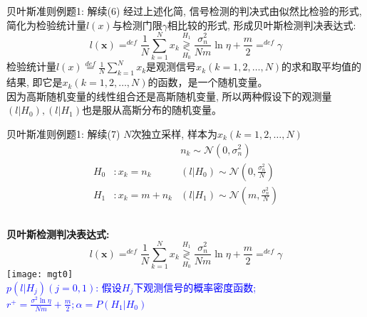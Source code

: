 \begin{frame}[shrink]{贝叶斯准则例题1: 解续(6)}
经过上述化简, 信号检测的判决式由似然比检验的形式, 简化为检验统计量$l(x)$与检测门限$\gamma$相比较的形式, 形成贝叶斯检测判决表达式:
\[
l(\bm{x})\mathop{=}^{def}\frac{1}{N}\sum\limits_{k=1}^{N}x_k\mathop{\gtrless}\limits_{H_0}^{H_1}\frac{\sigma_n^2}{Nm}\ln\eta+\frac{m}{2}\mathop{=}^{def}\gamma
\]
检验统计量$l(x)\mathop{=}\limits^{def}\frac{1}{N}\sum\limits_{k=1}^Nx_k$是观测信号$x_k(k=1,2,\dots,N)$的求和取平均值的结果, 即它是$x_k(k=1,2,\dots,N)$的函数，是一个随机变量。\\
因为高斯随机变量的线性组合还是高斯随机变量,  所以两种假设下的观测量$(l|H_0),(l|H_1)$也是服从高斯分布的随机变量。
\end{frame}

\begin{frame}[shrink]{贝叶斯准则例题1: 解续(7)}
$N$次独立采样, 样本为$x_k(k=1,2,\dots,N)$
\begin{align*}
	&&n_k\sim\mathcal{N}(0,\sigma_n^2)\\ 
	H_0 &:x_k=n_k   &(l|H_0)\sim\mathcal{N}(0,\frac{\sigma_n^2}{N})\\
	H_1 &:x_k=m+n_k &(l|H_1)\sim\mathcal{N}(m,\frac{\sigma_n^2}{N})
\end{align*}
\begin{columns}
\textbf{贝叶斯检测判决表达式:}\\
\[
l(\bm{x})\mathop{=}^{def}\frac{1}{N}\sum\limits_{k=1}^{N}x_k\mathop{\gtrless}\limits_{H_0}^{H_1}\frac{\sigma_n^2}{Nm}\ln\eta+\frac{m}{2}\mathop{=}^{def}\gamma
\]
\texttt{[image: mgt0]}\\
\scriptsize
\textcolor{blue}{$p(l|H_j)(j=0,1)$: 假设$H_j$下观测信号的概率密度函数; $r^+=\frac{\sigma^2\ln\eta}{Nm}+\frac{m}{2}; \alpha=P(H_1|H_0)$}
\end{columns}
\end{frame}



